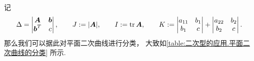 记\begin{equation*}
	\Delta = \begin{vmatrix}
		\boldsymbol{A} & \boldsymbol{b} \\
		\boldsymbol{b}^T & c
	\end{vmatrix},
	\qquad
	J := \abs{\boldsymbol{A}},
	\qquad
	I := \tr\boldsymbol{A},
	\qquad
	K := \begin{vmatrix}
		a_{11} & b_1 \\
		b_1 & c
	\end{vmatrix}
	+ \begin{vmatrix}
		a_{22} & b_2 \\
		b_2 & c
	\end{vmatrix}.
\end{equation*}
那么我们可以据此对平面二次曲线进行分类，
大致如\cref{table:二次型的应用.平面二次曲线的分类} 所示.


